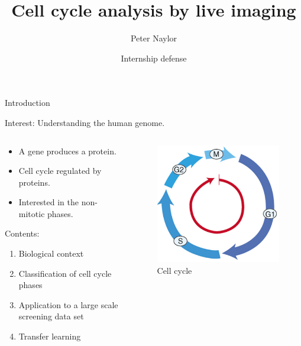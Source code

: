 \documentclass{beamer}
\title{Cell cycle analysis by live imaging}
\author{Peter Naylor}
\date{Internship defense}
\begin{document}
\begin{frame}
  \titlepage
\end{frame}

\begin{frame}{Introduction}

Interest: Understanding the human genome.

\begin{columns}[T] %
\begin{column}{.50\textwidth}

\begin{itemize}
\item A gene produces a protein.
\item Cell cycle regulated by proteins.
\item Interested in the non-mitotic phases.
\end{itemize}

Contents:
\begin{enumerate}
\item Biological context
\item Classification of cell cycle phases
\item Application to a large scale screening data set
\item Transfer learning
\end{enumerate}

\end{column}%

\hfill%
\begin{column}{.30\textwidth}
\begin{figure}[!ht]
\centering
\includegraphics[width=\textwidth]{./Images/somaticcellcycle3.png}
\caption{Cell cycle}
\label{cellcycle}
\end{figure}
\end{column}%
\end{columns}

\end{frame}
\end{document}
